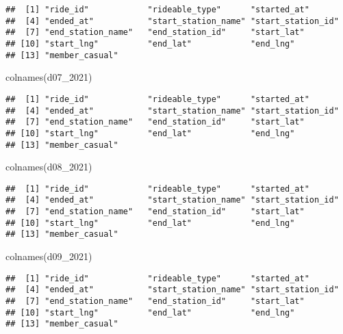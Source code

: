 \documentclass[
]{article}
\newenvironment{Shaded}{\begin{snugshade}}{\end{snugshade}}
\newcommand{\FunctionTok}[1]{\textcolor[rgb]{0.00,0.00,0.00}{#1}}
\newcommand{\NormalTok}[1]{#1}
\begin{document}
\begin{verbatim}
##  [1] "ride_id"            "rideable_type"      "started_at"        
##  [4] "ended_at"           "start_station_name" "start_station_id"  
##  [7] "end_station_name"   "end_station_id"     "start_lat"         
## [10] "start_lng"          "end_lat"            "end_lng"           
## [13] "member_casual"
\end{verbatim}

\begin{Shaded}
\begin{Highlighting}[]
\FunctionTok{colnames}\NormalTok{(d07\_2021)}
\end{Highlighting}
\end{Shaded}

\begin{verbatim}
##  [1] "ride_id"            "rideable_type"      "started_at"        
##  [4] "ended_at"           "start_station_name" "start_station_id"  
##  [7] "end_station_name"   "end_station_id"     "start_lat"         
## [10] "start_lng"          "end_lat"            "end_lng"           
## [13] "member_casual"
\end{verbatim}

\begin{Shaded}
\begin{Highlighting}[]
\FunctionTok{colnames}\NormalTok{(d08\_2021)}
\end{Highlighting}
\end{Shaded}

\begin{verbatim}
##  [1] "ride_id"            "rideable_type"      "started_at"        
##  [4] "ended_at"           "start_station_name" "start_station_id"  
##  [7] "end_station_name"   "end_station_id"     "start_lat"         
## [10] "start_lng"          "end_lat"            "end_lng"           
## [13] "member_casual"
\end{verbatim}

\begin{Shaded}
\begin{Highlighting}[]
\FunctionTok{colnames}\NormalTok{(d09\_2021)}
\end{Highlighting}
\end{Shaded}

\begin{verbatim}
##  [1] "ride_id"            "rideable_type"      "started_at"        
##  [4] "ended_at"           "start_station_name" "start_station_id"  
##  [7] "end_station_name"   "end_station_id"     "start_lat"         
## [10] "start_lng"          "end_lat"            "end_lng"           
## [13] "member_casual"
\end{verbatim}
\end{document}

